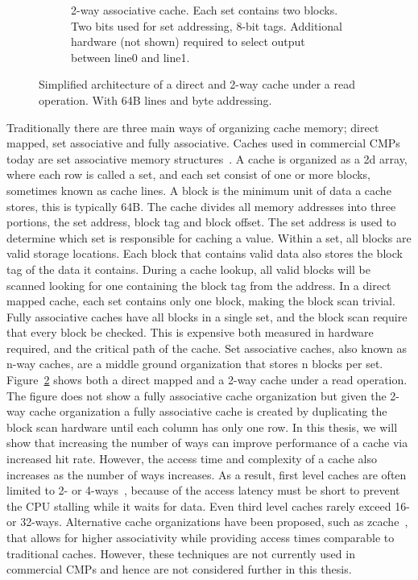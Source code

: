 \begin{figure}
\begin{subfigure}[b]{0.45\textwidth}
        \caption{2-way associative cache. Each set contains two blocks. Two bits used for set addressing, 8-bit tags. Additional hardware (not shown) required to select output between line0 and line1.}
        \label{fig:introduction:cache:2way}
    \end{subfigure}
    \caption[Direct mapped and 2-way cache architecture.]{Simplified architecture of a direct and 2-way cache under a read operation. With 64B lines and byte addressing.}
    \label{fig:introduction:cache}
\end{figure}

Traditionally there are three main ways of organizing cache memory; direct mapped, set associative and fully associative.
Caches used in commercial CMPs today are set associative memory structures~\cite{Thomadakis2011, Jain2013, ARM2010, Ho2014}.
A cache is organized as a 2d array, where each row is called a set, and each set consist of one or more blocks, sometimes known as cache lines.
A block is the minimum unit of data a cache stores, this is typically 64B.
The cache divides all memory addresses into three portions, the set address, block tag and block offset.
The set address is used to determine which set is responsible for caching a value.
Within a set, all blocks are valid storage locations.
Each block that contains valid data also stores the block tag of the data it contains.
During a cache lookup, all valid blocks will be scanned looking for one containing the block tag from the address.
In a direct mapped cache, each set contains only one block, making the block scan trivial.
Fully associative caches have all blocks in a single set, and the block scan require that every block be checked.
This is expensive both measured in hardware required, and the critical path of the cache.
Set associative caches, also known as n-way caches, are a middle ground organization that stores n blocks per set.
Figure~\ref{fig:introduction:cache} shows both a direct mapped and a 2-way cache under a read operation.
The figure does not show a fully associative cache organization but given the 2-way cache organization a fully associative cache is created by duplicating the block scan hardware until each column has only one row.
In this thesis, we will show that increasing the number of ways can improve performance of a cache via increased hit rate.
However, the access time and complexity of a cache also increases as the number of ways increases.
As a result, first level caches are often limited to 2- or 4-ways~\cite{Sanchez2010}, because of the access latency must be short to prevent the CPU stalling while it waits for data. 
Even third level caches rarely exceed 16- or 32-ways.
Alternative cache organizations have been proposed, such as zcache~\cite{Sanchez2010}, that allows for higher associativity while providing access times comparable to traditional caches.
However, these techniques are not currently used in commercial CMPs and hence are not considered further in this thesis.

